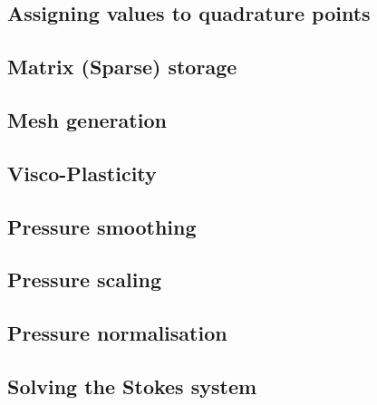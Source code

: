 \documentclass[a4paper]{article}
\numberwithin{equation}{section}
\begin{document}
\subsection{Assigning values to quadrature points}  %
\newpage %
\subsection{Matrix (Sparse) storage}  %
\newpage %
\subsection{Mesh generation} \label{sec:meshes}  %
\newpage %
\subsection{Visco-Plasticity}  %
\newpage %
\subsection{Pressure smoothing \label{psmoothing}}  %
\newpage %
\subsection{Pressure scaling}  %
\newpage %
\subsection{Pressure normalisation\label{ss_pnorm}}  %
\newpage %
\subsection{Solving the Stokes system \label{sec:solvers}}  %
\newpage %
\end{document}
